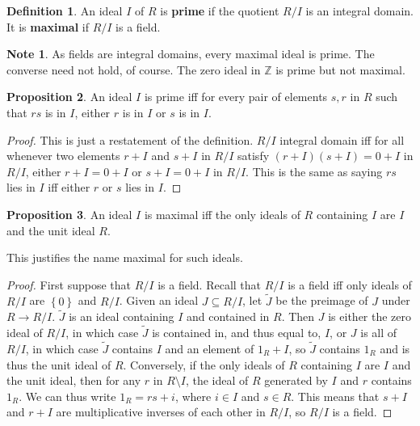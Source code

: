 \documentclass{article}
\newcommand{\Z}{\mathbb{Z}}
\newcommand{\rb}[1]{\left( #1 \right)}
\newcommand{\cb}[1]{\left\{ #1 \right\}}
\theoremstyle{definition}\newtheorem{definition}{Definition}[section]
\theoremstyle{definition}\newtheorem{remark}[definition]{Remark}
\theoremstyle{definition}\newtheorem*{example}{Example}
\theoremstyle{definition}\newtheorem*{note}{Note}
\newtheorem{proposition}[definition]{Proposition}
\begin{document}

\begin{definition}
An ideal $ I $ of $ R $ is \textbf{prime} if the quotient $ R / I $ is an integral domain. It is \textbf{maximal} if $ R / I $ is a field.
\end{definition}

\begin{note}
As fields are integral domains, every maximal ideal is prime. The converse need not hold, of course. The zero ideal in $ \Z $ is prime but not maximal.
\end{note}

\begin{proposition}
An ideal $ I $ is prime iff for every pair of elements $ s, r $ in $ R $ such that $ rs $ is in $ I $, either $ r $ is in $ I $ or $ s $ is in $ I $.
\end{proposition}

\begin{proof}
This is just a restatement of the definition. $ R / I $ integral domain iff for all whenever two elements $ r + I $ and $ s + I $ in $ R / I $ satisfy $ \rb{r + I}\rb{s + I} = 0 + I $ in $ R / I $, either $ r + I = 0 + I $ or $ s + I = 0 + I $ in $ R / I $. This is the same as saying $ rs $ lies in $ I $ iff either $ r $ or $ s $ lies in $ I $.
\end{proof}

\begin{proposition}
An ideal $ I $ is maximal iff the only ideals of $ R $ containing $ I $ are $ I $ and the unit ideal $ R $.
\end{proposition}

This justifies the name maximal for such ideals.

\begin{proof}
First suppose that $ R / I $ is a field. Recall that $ R / I $ is a field iff only ideals of $ R / I $ are $ \cb{0} $ and $ R / I $. Given an ideal $ J \subseteq R / I $, let $ \tilde{J} $ be the preimage of $ J $ under $ R \to R / I $. $ \tilde{J} $ is an ideal containing $ I $ and contained in $ R $. Then $ J $ is either the zero ideal of $ R / I $, in which case $ \tilde{J} $ is contained in, and thus equal to, $ I $, or $ J $ is all of $ R / I $, in which case $ \tilde{J} $ contains $ I $ and an element of $ 1_R + I $, so $ \tilde{J} $ contains $ 1_R $ and is thus the unit ideal of $ R $. Conversely, if the only ideals of $ R $ containing $ I $ are $ I $ and the unit ideal, then for any $ r $ in $ R \setminus I $, the ideal of $ R $ generated by $ I $ and $ r $ contains $ 1_R $. We can thus write $ 1_R = rs + i $, where $ i \in I $ and $ s \in R $. This means that $ s + I $ and $ r + I $ are multiplicative inverses of each other in $ R / I $, so $ R / I $ is a field.
\end{proof}
\end{document}
